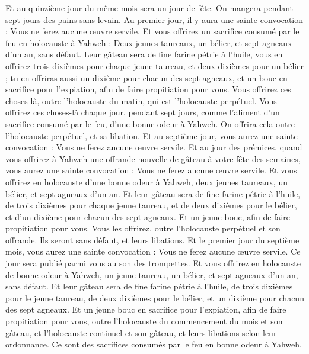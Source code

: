 \begin{multicols}{2}
Et au quinzième jour du même mois sera un jour de fête. On mangera pendant sept jours des pains sans levain.
Au premier jour, il y aura une sainte convocation : Vous ne ferez aucune œuvre servile.
Et vous offrirez un sacrifice consumé par le feu en holocauste à Yahweh : Deux jeunes taureaux, un bélier, et sept agneaux d'un an, sans défaut.
Leur gâteau sera de fine farine pétrie à l’huile, vous en offrirez trois dixièmes pour chaque jeune taureau, et deux dixièmes pour un bélier ;
tu en offriras aussi un dixième pour chacun des sept agneaux,
et un bouc en sacrifice pour l'expiation, afin de faire propitiation pour vous.
Vous offrirez ces choses là, outre l'holocauste du matin, qui est l'holocauste perpétuel.
Vous offrirez ces choses-là chaque jour, pendant sept jours, comme l'aliment d'un sacrifice consumé par le feu, d'une bonne odeur à Yahweh. On offrira cela outre l'holocauste perpétuel, et sa libation.
Et au septième jour, vous aurez une sainte convocation : Vous ne ferez aucune œuvre servile.
Et au jour des prémices, quand vous offrirez à Yahweh une offrande nouvelle de gâteau à votre fête des semaines, vous aurez une sainte convocation : Vous ne ferez aucune œuvre servile.
Et vous offrirez en holocauste d'une bonne odeur à Yahweh, deux jeunes taureaux, un bélier, et sept agneaux d'un an.
Et leur gâteau sera de fine farine pétrie à l’huile, de trois dixièmes pour chaque jeune taureau, et de deux dixièmes pour le bélier,
et d'un dixième pour chacun des sept agneaux.
Et un jeune bouc, afin de faire propitiation pour vous.
Vous les offrirez, outre l'holocauste perpétuel et son offrande. Ils seront sans défaut, et leurs libations.
\VerseOne{}Et le premier jour du septième mois, vous aurez une sainte convocation : Vous ne ferez aucune œuvre servile. Ce jour sera publié parmi vous au son des trompettes.
Et vous offrirez en holocauste de bonne odeur à Yahweh, un jeune taureau, un bélier, et sept agneaux d'un an, sans défaut.
Et leur gâteau sera de fine farine pétrie à l’huile, de trois dixièmes pour le jeune taureau, de deux dixièmes pour le bélier,
et un dixième pour chacun des sept agneaux.
Et un jeune bouc en sacrifice pour l'expiation, afin de faire propitiation pour vous,
outre l’holocauste du commencement du mois et son gâteau, et l’holocauste continuel et son gâteau, et leurs libations selon leur ordonnance. Ce sont des sacrifices consumés par le feu en bonne odeur à Yahweh.

\end{multicols}
